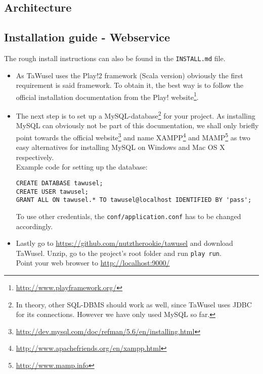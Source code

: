\subsection{Architecture}\label{ssec:WebArchitecture}


\subsection{Installation guide - Webservice}\label{ssec:WebInst}

The rough install instructions can also be found in the \texttt{INSTALL.md} file.
\begin{itemize}

\item As TaWusel uses the Play!2 framework (Scala version) obviously the first requirement is said framework. To obtain it, the
best way is to follow the official installation documentation from the Play!
website\footnote{\url{http://www.playframework.org/}}.

\item The next step is to set up a MySQL-database\footnote{In theory, other SQL-DBMS should work as well, since TaWusel uses
JDBC for its connections. However we have only used MySQL so far.} for your project.
As installing MySQL can obviously not be part of this documentation, we shall only briefly point towards the official
website\footnote{\url{http://dev.mysql.com/doc/refman/5.6/en/installing.html}} and name
XAMPP\footnote{\url{http://www.apachefriends.org/en/xampp.html}} and MAMP\footnote{\url{http://www.mamp.info}} as two easy
alternatives
for installing MySQL on Windows and Mac OS X respectively.\\
Example code for setting up the database:
\begin{verbatim}
CREATE DATABASE tawusel;
CREATE USER tawusel;
GRANT ALL ON tawusel.* TO tawusel@localhost IDENTIFIED BY 'pass';
\end{verbatim}
\small{To use other credentials, the \texttt{conf/application.conf} has to be changed accordingly.}

\item Lastly go to \url{https://github.com/nutztherookie/tawusel} and download TaWusel. Unzip, go to the project's root folder and
run \texttt{play run}.\\
Point your web browser to \url{http://localhost:9000/}


\end{itemize}